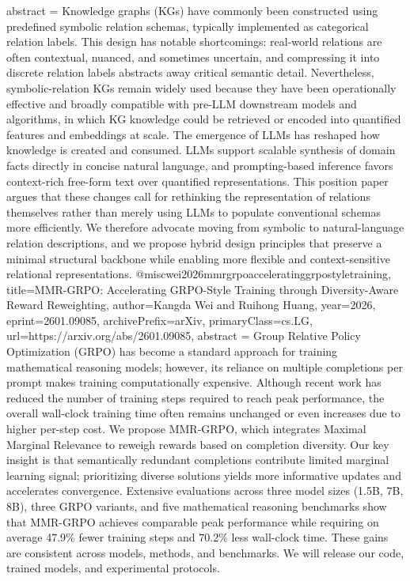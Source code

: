 {      abstract = {Knowledge graphs (KGs) have commonly been constructed using predefined symbolic relation schemas, typically implemented as categorical relation labels. This design has notable shortcomings: real-world relations are often contextual, nuanced, and sometimes uncertain, and compressing it into discrete relation labels abstracts away critical semantic detail. Nevertheless, symbolic-relation KGs remain widely used because they have been operationally effective and broadly compatible with pre-LLM downstream models and algorithms, in which KG knowledge could be retrieved or encoded into quantified features and embeddings at scale. The emergence of LLMs has reshaped how knowledge is created and consumed. LLMs support scalable synthesis of domain facts directly in concise natural language, and prompting-based inference favors context-rich free-form text over quantified representations. This position paper argues that these changes call for rethinking the representation of relations themselves rather than merely using LLMs to populate conventional schemas more efficiently. We therefore advocate moving from symbolic to natural-language relation descriptions, and we propose hybrid design principles that preserve a minimal structural backbone while enabling more flexible and context-sensitive relational representations.}
}@misc{wei2026mmrgrpoacceleratinggrpostyletraining,
      title={MMR-GRPO: Accelerating GRPO-Style Training through Diversity-Aware Reward Reweighting}, 
      author={Kangda Wei and Ruihong Huang},
      year={2026},
      eprint={2601.09085},
      archivePrefix={arXiv},
      primaryClass={cs.LG},
      url={https://arxiv.org/abs/2601.09085},
      abstract = {Group Relative Policy Optimization (GRPO) has become a standard approach for training mathematical reasoning models; however, its reliance on multiple completions per prompt makes training computationally expensive. Although recent work has reduced the number of training steps required to reach peak performance, the overall wall-clock training time often remains unchanged or even increases due to higher per-step cost. We propose MMR-GRPO, which integrates Maximal Marginal Relevance to reweigh rewards based on completion diversity. Our key insight is that semantically redundant completions contribute limited marginal learning signal; prioritizing diverse solutions yields more informative updates and accelerates convergence. Extensive evaluations across three model sizes (1.5B, 7B, 8B), three GRPO variants, and five mathematical reasoning benchmarks show that MMR-GRPO achieves comparable peak performance while requiring on average 47.9\% fewer training steps and 70.2\% less wall-clock time. These gains are consistent across models, methods, and benchmarks. We will release our code, trained models, and experimental protocols.}
}
